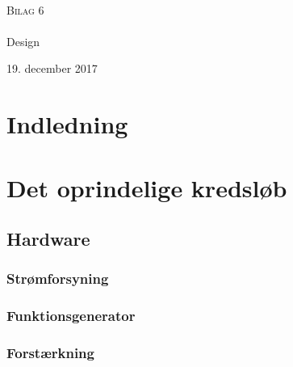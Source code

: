 \documentclass[main.tex]{subfiles}
\begin{document}
\begin{titlingpage}
\begin{center}

~ \\[3cm]


\textsc{\LARGE Bilag 6}\\[1.5cm]


\noindent\makebox[\linewidth]{\rule{\textwidth}{0.4pt}}\\
[0.5cm]{\Huge Design}
\noindent\makebox[\linewidth]{\rule{\textwidth}{0.4pt}}
\end{center}
\vfill
\begin{center}
{\large 19. december 2017}
\end{center}
\end{titlingpage}

\newpage
\tableofcontents*
\newpage

\chapter{Indledning}



\chapter{Det oprindelige kredsløb}
\section{Hardware}

\subsection{Strømforsyning}



\subsection{Funktionsgenerator}




\subsection{Forstærkning}
\end{document}

